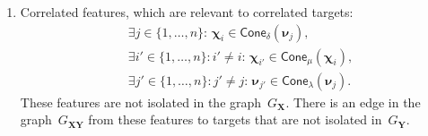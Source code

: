 \documentclass[12pt,twoside]{article}
\theoremstyle{definition}
\newcommand{\bY}{\mathbf{Y}}
\newcommand{\bX}{\mathbf{X}}
\newcommand{\bchi}{\boldsymbol{\chi}}
\newcommand{\bnu}{\boldsymbol{\nu}}
\begin{document}
\begin{enumerate}
	\item Correlated features, which are relevant to correlated targets:
	\begin{align*}
	&\exists j \in \{1, \dots, n\}: \, \bchi_i \in \textsf{Cone}_{\delta} (\bnu_j), \\
	&\exists i' \in \{1, \dots, n\}: i' \neq i: \,\bchi_{i'} \in \textsf{Cone}_{\mu} (\bchi_i),  \\
	&\exists j' \in \{1, \dots, n\}: j' \neq j: \,\bnu_{j'} \in \textsf{Cone}_{\lambda} (\bnu_j).
	\end{align*}
	These features are not isolated in the graph~$G_{\bX}$. There is an edge in the graph~$G_{\bX\bY}$ from these features to targets that are not isolated in~$G_{\bY}$.
\end{enumerate}
\end{document}
